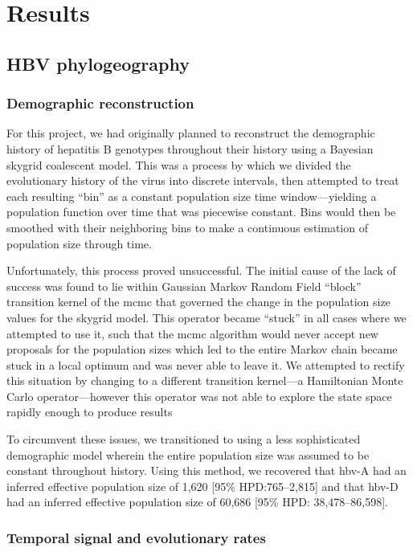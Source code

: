 \chapter{Results}\label{ch:results}

\section{HBV phylogeography}

\subsection{Demographic reconstruction}

For this project, we had originally planned to reconstruct the demographic history of hepatitis B genotypes throughout their history using a Bayesian skygrid coalescent model.
This was a process by which we divided the evolutionary history of the virus into discrete intervals, then attempted to treat each resulting ``bin'' as a constant population size time window---yielding a population function over time that was piecewise constant.
Bins would then be smoothed with their neighboring bins to make a continuous estimation of population size through time.

Unfortunately, this process proved unsuccessful.
The initial cause of the lack of success was found to lie within Gaussian Markov Random Field ``block'' transition kernel of the \gls{mcmc} that governed the change in the population size values for the skygrid model.
This operator became ``stuck'' in all cases where we attempted to use it, such that the \gls{mcmc} algorithm would never accept new proposals for the population sizes which led to the entire Markov chain became stuck in a local optimum and was never able to leave it.
We attempted to rectify this situation by changing to a different transition kernel---a Hamiltonian Monte Carlo operator---however this operator was not able to explore the state space rapidly enough to produce results

To circumvent these issues, we transitioned to using a less sophisticated demographic model wherein the entire population size was assumed to be constant throughout history.
Using this method, we recovered that \gls{hbv}-A had an inferred effective population size of 1,620 [95\% HPD:765--2,815] and that \gls{hbv}-D had an inferred effective population size of 60,686 [95\% HPD: 38,478--86,598].

\subsection{Temporal signal and evolutionary rates}

